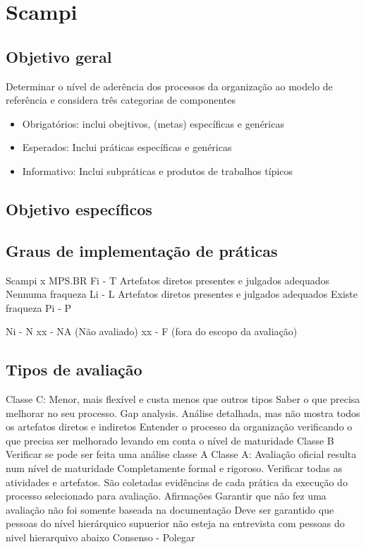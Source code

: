 \documentclass{article}
\begin{document}
\section{Scampi}
\subsection{Objetivo geral}
	Determinar o nível de aderência dos processos da organização ao modelo de referência e considera três categorias de componentes	
	\begin{itemize}
	\item Obrigatórios: inclui obejtivos, (metas) específicas e genéricas
	\item Esperados: Inclui práticas específicas e genéricas
	\item Informativo: Inclui subpráticas e produtos de trabalhos típicos
	\end{itemize}
\subsection{Objetivo específicos}

\subsection{Graus de implementação de práticas}
	Scampi x MPS.BR
	Fi - T
	Artefatos diretos presentes e julgados adequados
	Nennuma fraqueza	
	Li - L
	Artefatos diretos presentes e julgados adequados
	Existe fraqueza
	Pi - P
		
	Ni - N
	xx - NA (Não avaliado)
	xx - F (fora do escopo da avaliação)
	
\subsection{Tipos de avaliação}
	Classe C: Menor, mais flexível e custa menos que outros tipos
		Saber o que precisa melhorar no seu processo. Gap analysis.
		Análise detalhada, mas não mostra todos os artefatos diretos e indiretos
		Entender o processo da organização verificando o que precisa ser melhorado levando em conta o nível de maturidade
	Classe B
		Verificar se pode ser feita uma análise classe A
	Classe A:
		Avaliação oficial resulta num nível de maturidade
		Completamente formal e rigoroso.
		Verificar todas as atividades e artefatos.
		São coletadas evidências de cada prática da execução do processo selecionado para avaliação.
		Afirmações
			Garantir que não fez uma avaliação não foi somente baseada na documentação
			Deve ser garantido que pessoas do nível hierárquico supuerior não esteja na entrevista com pessoas do nivel hierarquivo abaixo
		Consenso - Polegar
\end{document}
